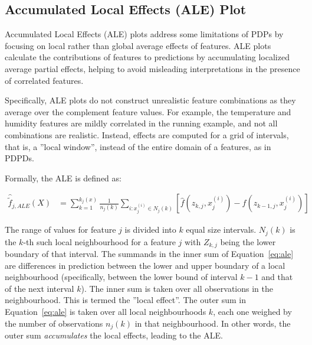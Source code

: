 \subsection{Accumulated Local Effects (ALE) Plot}

Accumulated Local Effects (ALE) plots address some limitations of PDPs by focusing on local rather than global average effects of features. ALE plots calculate the contributions of features to predictions by accumulating localized average partial effects, helping to avoid misleading interpretations in the presence of correlated features. 

Specifically, ALE plots do not construct unrealistic feature combinations as they average over the complement feature values. For example, the temperature and humidity features are mildly correlated in the running example, and not all combinations are realistic. Instead, effects are computed for a grid of intervals, that is, a ''local window'', instead of the entire domain of a features, as in PDPDs.

Formally, the ALE is defined as:

\begin{align}
\hat{\tilde{f}}_{j, ALE}(X) &= \sum_{k=1}^{k_j(x)} \frac{1}{n_j(k)} \sum_{i:x_j^{(i)} \in N_j(k)} \left[\hat{f}(z_{k, j}, x^{(i)}_j) - \hat{f} (z_{k-1, j},x^{(i)}_j) \right] \label{eq:ale}
\end{align}

The range of values for feature $j$ is divided into $k$ equal size intervals. $N_j(k)$ is the $k$-th such local neighbourhood for a feature $j$ with $Z_{k,j}$ being the lower boundary of that interval. The summands in the inner sum of Equation~\ref{eq:ale} are differences in prediction between the lower and upper boundary of a local neighbourhood (specifically, between the lower bound of interval $k-1$ and that of the next interval $k$). The inner sum is taken over all observations in the neighbourhood. This is termed the ''local effect''. The outer sum in Equation~\ref{eq:ale} is taken over all local neighbourhoods $k$, each one weighed by the number of observations $n_j(k)$ in that neighbourhood. In other words, the outer sum \emph{accumulates} the local effects, leading to the ALE.

